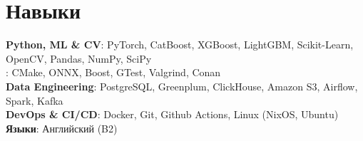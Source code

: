 \documentclass[letterpaper,11pt]{article}
\begin{document}
\section{Навыки}
 \begin{itemize}[leftmargin=0.15in, label={}]
    \small{\item{
     \textbf{Python, ML \& CV}{: PyTorch, CatBoost, XGBoost, LightGBM, Scikit-Learn, OpenCV, Pandas, NumPy, SciPy} \\
     \textbf{\cpp}{: CMake, ONNX, Boost, GTest, Valgrind, Conan} \\
     \textbf{Data Engineering}{: PostgreSQL, Greenplum, ClickHouse, Amazon S3, Airflow, Spark, Kafka} \\
     \textbf{DevOps \& CI/CD}{: Docker, Git, Github Actions, Linux (NixOS, Ubuntu)} \\
     \textbf{Языки}{: Английский (B2)}
    }}
 \end{itemize}

\end{document}
